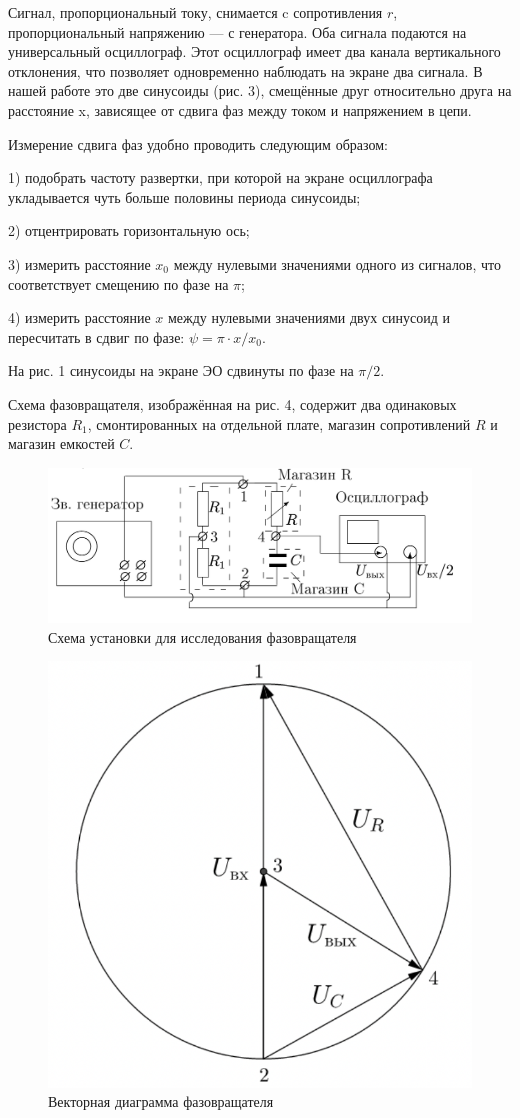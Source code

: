 \documentclass[12pt,a4paper]{article}
\begin{document}
Сигнал, пропорциональный току, снимается c сопротивления $r$, пропорциональный напряжению — с генератора. 
Оба сигнала подаются на универсальный осциллограф. 
Этот осциллограф имеет два канала вертикального отклонения, что позволяет одновременно наблюдать на экране два сигнала. 
В нашей работе это две синусоиды (рис. 3), смещённые друг относительно друга на расстояние x, зависящее от сдвига фаз между током и напряжением в цепи.

Измерение сдвига фаз удобно проводить следующим образом:
     
1) подобрать частоту развертки, при которой на экране осциллографа укладывается чуть больше половины периода синусоиды;
    
2) отцентрировать горизонтальную ось; 

3) измерить расстояние $x_0$ между нулевыми значениями одного из сигналов, что соответствует смещению по фазе на $\pi$;

4) измерить расстояние $x$ между нулевыми значениями двух синусоид и пересчитать в сдвиг по фазе: $\psi = \pi \cdot x/x_0$.

На рис. 1 синусоиды на экране ЭО сдвинуты по фазе на $\pi/2$.

Схема фазовращателя, изображённая на рис. 4, содержит два одинаковых резистора $R_1$, смонтированных на отдельной плате, магазин сопротивлений $R$ и магазин емкостей $C$.

\begin{figure}[h]
    \centering
    \includegraphics[width=0.7\linewidth]{scheme2.png}
    \caption{Схема установки для исследования фазовращателя}
\end{figure}

\begin{figure}[h]
    \centering
    \includegraphics[width=0.4\linewidth]{vectdiagramma.png}
    \caption{Векторная диаграмма фазовращателя}
\end{figure}
\end{document}
